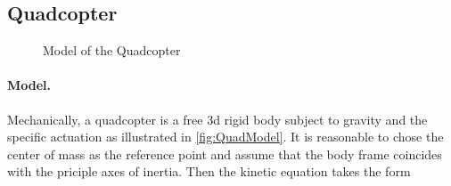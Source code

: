 \subsection{Quadcopter}\label{sec:CtrlExampleQuadcopter}

\begin{figure}[ht]
 \centering
 
 \caption{Model of the Quadcopter}
 \label{fig:QuadModel}
\end{figure}

\paragraph{Model.}
Mechanically, a quadcopter is a free 3d rigid body subject to gravity and the specific actuation as illustrated in \autoref{fig:QuadModel}.
It is reasonable to chose the center of mass as the reference point and assume that the body frame coincides with the priciple axes of inertia.
Then the kinetic equation takes the form
